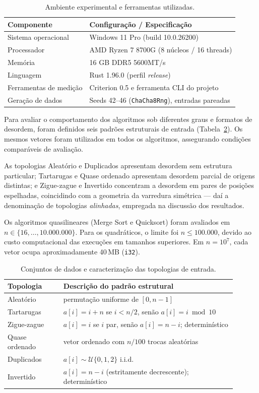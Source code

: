 \documentclass[12pt]{article}
\begin{document}
\begin{table}[htbp]
\centering
\caption{Ambiente experimental e ferramentas utilizadas.}
\label{tab:ambiente}
\begin{tabular}{ll}
\hline
\textbf{Componente} & \textbf{Configuração / Especificação} \\
\hline
Sistema operacional & Windows 11 Pro (build 10.0.26200) \\
Processador & AMD Ryzen 7 8700G (8 núcleos / 16 threads) \\
Memória & 16 GB DDR5 5600MT/s \\
Linguagem & Rust 1.96.0 (perfil \emph{release}) \\
Ferramentas de medição & Criterion 0.5 e ferramenta CLI do projeto \\
Geração de dados & Seeds 42--46 (\texttt{ChaCha8Rng}), entradas pareadas \\
\hline
\end{tabular}
\end{table}

Para avaliar o comportamento dos algoritmos sob diferentes graus e formatos de desordem, foram definidos seis padrões estruturais de entrada (Tabela~\ref{tab:datasets}). Os mesmos vetores foram utilizados em todos os algoritmos, assegurando condições comparáveis de avaliação.

As topologias Aleatório e Duplicados apresentam desordem sem estrutura particular; Tartarugas e Quase ordenado apresentam desordem parcial de origens distintas; e Zigue-zague e Invertido concentram a desordem em pares de posições espelhadas, coincidindo com a geometria da varredura simétrica --- daí a denominação de topologias \emph{alinhadas}, empregada na discussão dos resultados.

Os algoritmos quasilineares (Merge Sort e Quicksort) foram avaliados em $n \in \{16, \ldots, 10.000.000\}$. Para os quadráticos, o limite foi $n \leq 100.000$, devido ao custo computacional das execuções em tamanhos superiores. Em $n=10^7$, cada vetor ocupa aproximadamente 40\,MB (\texttt{i32}).

\begin{table}[htbp]
\centering
\caption{Conjuntos de dados e caracterização das topologias de entrada.}
\label{tab:datasets}
\small
\begin{tabular}{>{\raggedright\arraybackslash}p{0.22\linewidth}>{\raggedright\arraybackslash}p{0.68\linewidth}}
\hline
\textbf{Topologia} & \textbf{Descrição do padrão estrutural} \\
\hline
Aleatório & permutação uniforme de $[0,n{-}1]$ \\
Tartarugas & $a[i]=i+n$ se $i<n/2$, senão $a[i]=i \bmod 10$ \\
Zigue-zague & $a[i]=i$ se $i$ par, senão $a[i]=n-i$; determinístico \\
Quase ordenado & vetor ordenado com $n/100$ trocas aleatórias \\
Duplicados & $a[i]\sim\mathcal{U}\{0,1,2\}$ i.i.d. \\
Invertido & $a[i]=n-i$ (estritamente decrescente); determinístico \\
\hline
\end{tabular}
\end{table}
\end{document}
